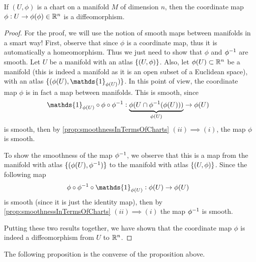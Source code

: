 \begin{proposition}
	\label{propositio:coordinateMapsAreSmooth}
	If $ (U,\phi) $ is a chart on a manifold $ M $ of dimension $ n $, then the coordinate map $ \phi:U\to\phi(\phi) \in \mathbb{R}^n$ is a diffeomorphism.
\end{proposition}
\begin{proof}
	For the proof, we will use the notion of smooth maps between manifolds in a smart way! First, observe that since $ \phi $ is a coordinate map, thus it is automatically a homeomorphism. Thus we just need to show that $ \phi $ and $ \phi^{-1} $ are smooth. Let $ U $ be a manifold with an atlas $ \{(U,\phi)\} $. Also, let $ \phi(U) \subset\mathbb{R}^n $ be a manifold (this is indeed a manifold as it is an open subset of a Euclidean space), with an atlas $ \set{(\phi(U),\mathds{1}_{\phi(U)})} $. In this point of view, the coordinate map $ \phi $ is in fact a map between manifolds. This is smooth, since 
	\[ \mathds{1}_{\phi(U)}\circ \phi\circ \inv{\phi}: \underbrace{\phi(U \cap \inv{\phi}(\phi(U)))}_{\phi(U)} \to \phi(U) \]
	is smooth, then by \autoref{prop:smoothnessInTermsOfCharts} $ (ii) \implies (i) $, the map $ \phi $ is smooth.
	
	To show the smoothness of the map $ \phi^{-1} $, we observe that this is a map from the manifold with atlas $ \{(\phi(U),\phi^{-1})\} $ to the manifold with atlas $ \{(U,\phi)\} $. Since the following map
	\[ \phi \circ \inv{\phi} \circ \mathds{1}_{\phi(U)}: \phi(U) \to \phi(U) \]
	is smooth (since it is just the identity map), then by \autoref{prop:smoothnessInTermsOfCharts} $ (ii) \implies (i) $ the map $ \phi^{-1} $ is smooth.
	
	Putting these two results together, we have shown that the coordinate map $ \phi $ is indeed a diffeomorphism from $ U $ to $ \mathbb{R}^n $.
\end{proof}


The following proposition is the converse of the proposition above.

